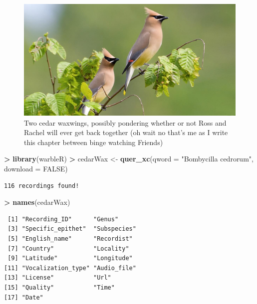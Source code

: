 \documentclass[]{krantz}
\makeatletter
\newenvironment{Shaded}{\begin{snugshade}}{\end{snugshade}}
\newcommand{\DataTypeTok}[1]{\textcolor[rgb]{0.27,0.27,0.27}{#1}}
\newcommand{\KeywordTok}[1]{\textcolor[rgb]{0.27,0.27,0.27}{\textbf{#1}}}
\newcommand{\NormalTok}[1]{#1}
\newcommand{\OperatorTok}[1]{\textcolor[rgb]{0.43,0.43,0.43}{\textbf{#1}}}
\newcommand{\OtherTok}[1]{\textcolor[rgb]{0.37,0.37,0.37}{#1}}
\newcommand{\StringTok}[1]{\textcolor[rgb]{0.5,0.5,0.5}{#1}}
\newenvironment{kframe}{%
\medskip{}
\setlength{\fboxsep}{.8em}
 \def\at@end@of@kframe{}%
 \ifinner\ifhmode%
  \def\at@end@of@kframe{\end{minipage}}%
  \begin{minipage}{\columnwidth}%
 \fi\fi%
 \def\FrameCommand##1{\hskip\@totalleftmargin \hskip-\fboxsep
 \colorbox{shadecolor}{##1}\hskip-\fboxsep
     \hskip-\linewidth \hskip-\@totalleftmargin \hskip\columnwidth}%
 \MakeFramed {\advance\hsize-\width
   \@totalleftmargin\z@ \linewidth\hsize
   \@setminipage}}%
 {\par\unskip\endMakeFramed%
 \at@end@of@kframe}
\renewenvironment{Shaded}{\begin{kframe}}{\end{kframe}}
\makeatother
\begin{document}
\begin{figure}
\includegraphics[width=16.67in]{figures/cedarWaxwing} \caption{Two cedar waxwings, possibly pondering whether or not Ross and Rachel will ever get back together (oh wait no that's me as I write this chapter between binge watching Friends)}\label{fig:waxwing}
\end{figure}

\begin{Shaded}
\begin{Highlighting}[]
\OperatorTok{>}\StringTok{ }\KeywordTok{library}\NormalTok{(warbleR)}
\OperatorTok{>}\StringTok{ }\NormalTok{cedarWax <-}\StringTok{ }\KeywordTok{quer_xc}\NormalTok{(}\DataTypeTok{qword =} \StringTok{"Bombycilla cedrorum"}\NormalTok{, }\DataTypeTok{download =} \OtherTok{FALSE}\NormalTok{)}
\end{Highlighting}
\end{Shaded}

\begin{verbatim}
116 recordings found!
\end{verbatim}

\begin{Shaded}
\begin{Highlighting}[]
\OperatorTok{>}\StringTok{ }\KeywordTok{names}\NormalTok{(cedarWax)}
\end{Highlighting}
\end{Shaded}

\begin{verbatim}
 [1] "Recording_ID"      "Genus"            
 [3] "Specific_epithet"  "Subspecies"       
 [5] "English_name"      "Recordist"        
 [7] "Country"           "Locality"         
 [9] "Latitude"          "Longitude"        
[11] "Vocalization_type" "Audio_file"       
[13] "License"           "Url"              
[15] "Quality"           "Time"             
[17] "Date"             
\end{verbatim}
\end{document}
